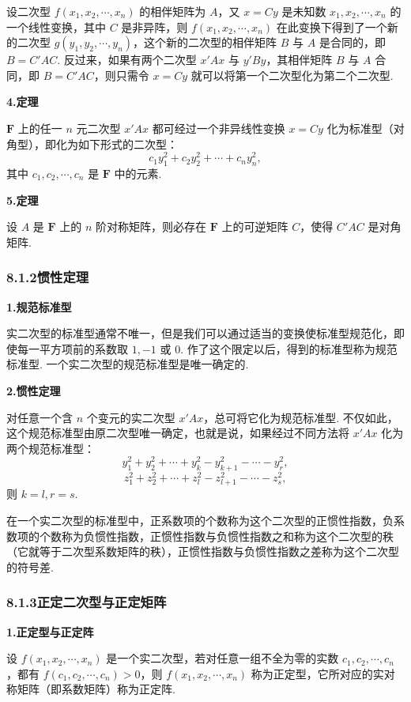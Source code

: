 \documentclass[UTF8,12pt,a4paper,fontset=fandol]{ctexart}
\begin{document}
设二次型 $f(x_1,x_2,\cdots,x_n)$ 的相伴矩阵为 $A$，又 $x=Cy$ 是未知数 $x_1,x_2,\cdots,x_n$ 的一个线性变换，其中 $C$ 是非异阵，则 $f(x_1,x_2,\cdots,x_n)$ 在此变换下得到了一个新的二次型 $g(y_1,y_2,\cdots,y_n)$，这个新的二次型的相伴矩阵 $B$ 与 $A$ 是合同的，即 $B=C'AC$. 反过来，如果有两个二次型 $x'Ax$ 与 $y'By$，其相伴矩阵 $B$ 与 $A$ 合同，即 $B=C'AC$，则只需令 $x=Cy$ 就可以将第一个二次型化为第二个二次型.

\noindent\textbf{4.\quad 定理}

$\mathbf{F}$ 上的任一 $n$ 元二次型 $x'Ax$ 都可经过一个非异线性变换 $x=Cy$ 化为标准型（对角型），即化为如下形式的二次型：
\[
c_1y_1^2+c_2y_2^2+\cdots+c_ny_n^2,
\]
其中 $c_1,c_2,\cdots,c_n$ 是 $\mathbf{F}$ 中的元素.

\noindent\textbf{5.\quad 定理}

设 $A$ 是 $\mathbf{F}$ 上的 $n$ 阶对称矩阵，则必存在 $\mathbf{F}$ 上的可逆矩阵 $C$，使得 $C'AC$ 是对角矩阵.

\subsubsection*{8.1.2\quad 惯性定理}

\noindent\textbf{1.\quad 规范标准型}

实二次型的标准型通常不唯一，但是我们可以通过适当的变换使标准型规范化，即使每一平方项前的系数取 $1,-1$ 或 $0$. 作了这个限定以后，得到的标准型称为规范标准型. 一个实二次型的规范标准型是唯一确定的.

\noindent\textbf{2.\quad 惯性定理}

对任意一个含 $n$ 个变元的实二次型 $x'Ax$，总可将它化为规范标准型. 不仅如此，这个规范标准型由原二次型唯一确定，也就是说，如果经过不同方法将 $x'Ax$ 化为两个规范标准型：
\[
y_1^2+y_2^2+\cdots+y_k^2-y_{k+1}^2-\cdots-y_r^2,
\]
\[
z_1^2+z_2^2+\cdots+z_l^2-z_{l+1}^2-\cdots-z_s^2,
\]
则 $k=l,r=s$.

在一个实二次型的标准型中，正系数项的个数称为这个二次型的正惯性指数，负系数项的个数称为负惯性指数，正惯性指数与负惯性指数之和称为这个二次型的秩（它就等于二次型系数矩阵的秩），正惯性指数与负惯性指数之差称为这个二次型的符号差.

\subsubsection*{8.1.3\quad 正定二次型与正定矩阵}

\noindent\textbf{1.\quad 正定型与正定阵}

设 $f(x_1,x_2,\cdots,x_n)$ 是一个实二次型，若对任意一组不全为零的实数 $c_1,c_2,\cdots,c_n$，都有 $f(c_1,c_2,\cdots,c_n)>0$，则 $f(x_1,x_2,\cdots,x_n)$ 称为正定型，它所对应的实对称矩阵（即系数矩阵）称为正定阵.
\end{document}
